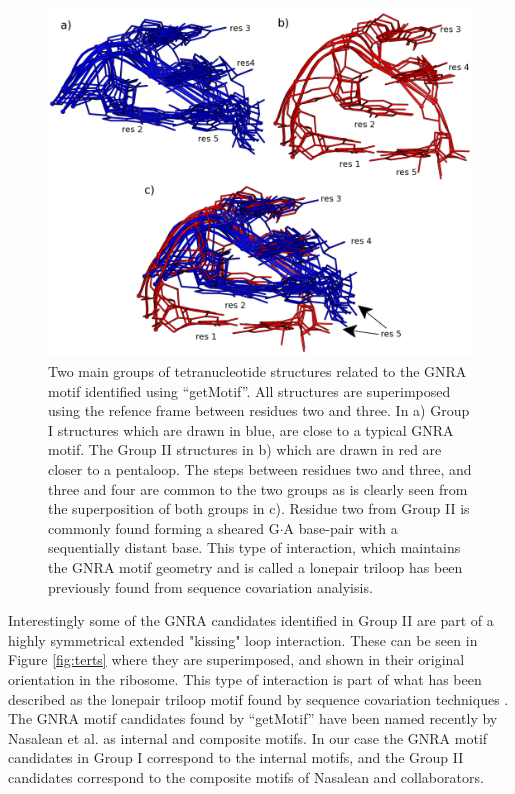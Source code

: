 \begin{figure}
\centering 
\includegraphics[angle=0, scale=2]{Chapter5/groupsB.png}
\caption{Two main groups of  tetranucleotide structures related to the
  GNRA  motif  identified   using  ``getMotif''.  All  structures  are
  superimposed  using  the  refence  frame between  residues  two  and
  three. In a)  Group I structures which are drawn  in blue, are close
  to a  typical GNRA motif.  The  Group II structures in  b) which are
  drawn in red  are closer to a pentaloop.  The steps between residues
  two and three, and three and four are common to the two groups as is
  clearly seen from  the superposition of both groups  in c).  Residue
  two  from Group  II is  commonly found  forming a  sheared G$\cdot$A
  base-pair  with   a  sequentially   distant  base.   This   type  of
  interaction, which maintains the GNRA motif geometry and is called a
  lonepair  triloop  \cite{lee2003}  has  been previously  found  from
  sequence covariation analyisis.}
\label{fig:groupsB}
\end{figure}

Interestingly some of  the GNRA candidates identified in  Group II are
part    of   a    highly   symmetrical    extended    "kissing"   loop
interaction. These  can be seen  in Figure \ref{fig:terts}  where they
are  superimposed, and  shown  in their  original  orientation in  the
ribosome. This type of interaction  is part of what has been described
as the lonepair triloop motif found by sequence covariation techniques
\cite{lee2003}.  The GNRA motif  candidates found by ``getMotif'' have
been named recently by Nasalean et al. \cite{nasalean2009} as internal
and composite motifs.  In our  case the GNRA motif candidates in Group
I  correspond to  the internal  motifs,  and the  Group II  candidates
correspond to the composite motifs of Nasalean and collaborators.

